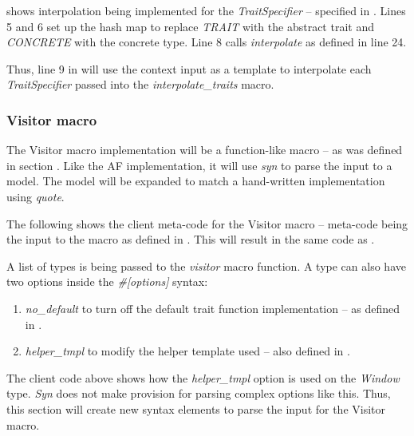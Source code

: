  shows interpolation being implemented for the \textit{TraitSpecifier} -- specified in .
Lines 5 and 6 set up the hash map to replace \textit{TRAIT} with the abstract trait and \textit{CONCRETE} with the concrete type.
Line 8 calls \textit{interpolate} as defined in  line 24.


Thus, line 9 in  will use the context input as a template to interpolate each \textit{TraitSpecifier} passed into the \textit{interpolate\_traits} macro.

\subsubsection{Visitor macro}
The Visitor macro implementation will be a function-like macro -- as was defined in section .
Like the AF implementation, it will use \textit{syn} to parse the input to a model.
The model will be expanded to match a hand-written implementation using \textit{quote}.

The following shows the client meta-code for the Visitor macro -- meta-code being the input to the macro as defined in .
This will result in the same code as .


A list of types is being passed to the \textit{visitor} macro function.
A type can also have two options inside the \textit{\#[options]} syntax:
\begin{enumerate}
	\item \textit{no\_default} to turn off the default trait function implementation -- as defined in .
	\item \textit{helper\_tmpl} to modify the helper template used -- also defined in .
\end{enumerate}

The client code above shows how the \textit{helper\_tmpl} option is used on the \textit{Window} type.
\textit{Syn} does not make provision for parsing complex options like this.
Thus, this section will create new syntax elements to parse the input for the Visitor macro.

